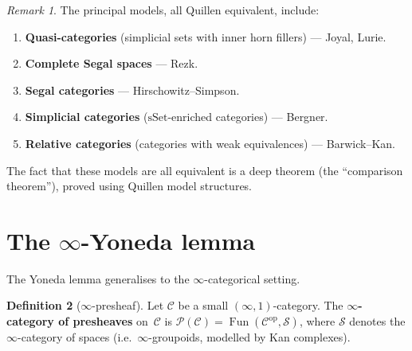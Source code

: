 \documentclass[a4paper,12pt]{book}
\DeclareMathOperator{\Fun}{Fun}
\newcommand{\op}{\mathrm{op}}
\theoremstyle{definition}
\newtheorem{definition}{Definition}[section]
\theoremstyle{plain}
\theoremstyle{remark}
\newtheorem{remark}[definition]{Remark}
\begin{document}
\begin{remark}\label{rem:models-infty1}
The principal models, all Quillen equivalent, include:
\begin{enumerate}[label=(\roman*)]
\item \textbf{Quasi-categories} (simplicial sets with inner horn fillers)
      --- Joyal, Lurie.
\item \textbf{Complete Segal spaces} --- Rezk.
\item \textbf{Segal categories} --- Hirschowitz--Simpson.
\item \textbf{Simplicial categories} ($\mathrm{sSet}$-enriched categories)
      --- Bergner.
\item \textbf{Relative categories} (categories with weak equivalences)
      --- Barwick--Kan.
\end{enumerate}
The fact that these models are all equivalent is a deep theorem
(the ``comparison theorem''), proved using Quillen model structures.
\end{remark}



\section{The $\infty$-Yoneda lemma}\label{sec:infty-yoneda}


The Yoneda lemma generalises to the $\infty$-categorical setting.

\begin{definition}[$\infty$-presheaf]\label{def:infty-presheaf}
Let $\mathcal{C}$ be a small $(\infty,1)$-category.
The \textbf{$\infty$-category of presheaves} on~$\mathcal{C}$ is
$\mathcal{P}(\mathcal{C}) = \Fun(\mathcal{C}^{\op}, \mathcal{S})$,
where $\mathcal{S}$ denotes the $\infty$-category of spaces
(i.e.\ $\infty$-groupoids, modelled by Kan complexes).
\end{definition}
\end{document}
